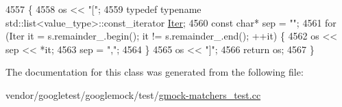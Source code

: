 \begin{DoxyCode}
4557                                                                      \{
4558     os << \textcolor{stringliteral}{"["};
4559     \textcolor{keyword}{typedef} \textcolor{keyword}{typename} std::list<value\_type>::const\_iterator \hyperlink{namespacegen__gtest__pred__impl_ac016218b7c9437d1d5ac85c574c83069}{Iter};
4560     \textcolor{keyword}{const} \textcolor{keywordtype}{char}* sep = \textcolor{stringliteral}{""};
4561     \textcolor{keywordflow}{for} (Iter it = s.remainder\_.begin(); it != s.remainder\_.end(); ++it) \{
4562       os << sep << *it;
4563       sep = \textcolor{stringliteral}{","};
4564     \}
4565     os << \textcolor{stringliteral}{"]"};
4566     \textcolor{keywordflow}{return} os;
4567   \}
\end{DoxyCode}


The documentation for this class was generated from the following file\+:\begin{DoxyCompactItemize}
\item 
vendor/googletest/googlemock/test/\hyperlink{gmock-matchers__test_8cc}{gmock-\/matchers\+\_\+test.\+cc}\end{DoxyCompactItemize}
